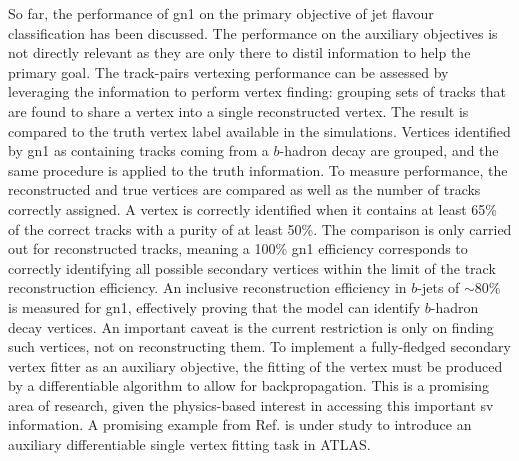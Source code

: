 So far, the performance of \gls{gn1} on the primary objective of jet flavour classification has been discussed. The performance on the auxiliary objectives is not directly relevant as they are only there to distil information to help the primary goal. The track-pairs vertexing performance can be assessed by leveraging the information to perform vertex finding: grouping sets of tracks that are found to share a vertex into a single reconstructed vertex. The result is compared to the truth vertex label available in the simulations. Vertices identified by \gls{gn1} as containing tracks coming from a $b$-hadron decay are grouped, and the same procedure is applied to the truth information. To measure performance, the reconstructed and true vertices are compared as well as the number of tracks correctly assigned. A vertex is correctly identified when it contains at least 65\% of the correct tracks with a purity of at least 50\%. The comparison is only carried out for reconstructed tracks, meaning a 100\% \gls{gn1} efficiency corresponds to correctly identifying all possible secondary vertices within the limit of the track reconstruction efficiency. An inclusive reconstruction efficiency in $b$-jets of $\sim$80\% is measured for \gls{gn1}, effectively proving that the model can identify $b$-hadron decay vertices. An important caveat is the current restriction is only on finding such vertices, not on reconstructing them. To implement a fully-fledged secondary vertex fitter as an auxiliary objective, the fitting of the vertex must be produced by a differentiable algorithm to allow for backpropagation. This is a promising area of research, given the physics-based interest in accessing this important \gls{sv} information. A promising example from Ref. \cite{smith2023differentiable} is under study to introduce an auxiliary differentiable single vertex fitting task in ATLAS. \\

